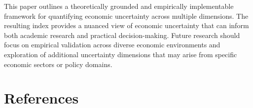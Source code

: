 \documentclass[5p,authoryear]{elsarticle}
\begin{document}
This paper outlines a theoretically grounded and empirically implementable framework for quantifying economic uncertainty across multiple dimensions. The resulting index provides a nuanced view of economic uncertainty that can inform both academic research and practical decision-making. Future research should focus on empirical validation across diverse economic environments and exploration of additional uncertainty dimensions that may arise from specific economic sectors or policy domains.




\pagebreak
\section*{References} \label{sec:references}
\renewcommand{\bibsection}{}


\pagebreak
\end{document}
